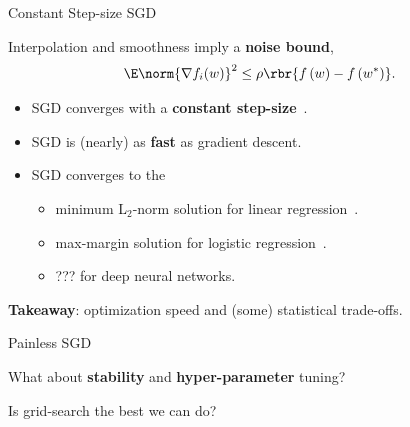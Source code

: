 \documentclass[notheorems]{beamer}
\def\\{}%
\begin{document}
    \begin{frame}{Constant Step-size SGD}

        Interpolation and smoothness imply a \textbf{noise bound},
        \begin{align*}
            \E \norm{\nabla f_i (w)}^2 \leq \rho \rbr{f\,(w) - f\,(w^*)}.
        \end{align*}

        \begin{itemize}
            \item SGD converges with a \textbf{constant step-size}~\citep{vaswani2019fast, bassily2018exponential}.
            \item SGD is (nearly) as \textbf{fast} as gradient descent.
            \item SGD converges to the
            \begin{itemize} \normalsize
                \item minimum L$_2$-norm solution for linear regression~\citep{wilson2017marginal}.
                \item max-margin solution for logistic regression~\citep{nacson2018stochastic}.
                \item ??? for deep neural networks.\vspace{1em}
            \end{itemize}
        \end{itemize}

        \textbf{Takeaway}: optimization speed and (some) statistical trade-offs.\\
        \vspace{0.1cm}

    \end{frame}

    \begin{frame}{Painless SGD}

        \begin{center}
            {\huge What about \textbf{stability} and \textbf{hyper-parameter} tuning?}

            \vspace{2em}
            {\Large Is grid-search the best we can do?}
            \vspace{2em}
        \end{center}

        \begin{figure}
        \end{figure}

    \end{frame}
\end{document}
